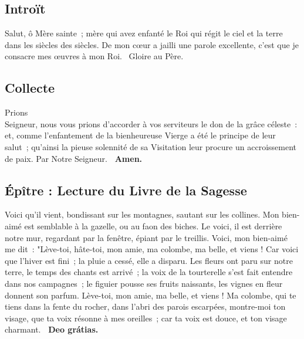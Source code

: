 

\clearpage
\begin{multicols}{2}
\subsection*{Introït}
{Salut, ô Mère sainte~; mère qui avez enfanté le Roi qui régit le ciel et la terre dans les siècles des siècles.}
De mon cœur a jailli une parole excellente, c’est que je consacre mes œuvres à mon Roi. \vb\ Gloire au Père.

\subsection*{Collecte}
{Prions\\
Seigneur, nous vous prions d’accorder à vos serviteurs le don de la grâce céleste~: et, comme l’enfantement de la bienheureuse Vierge a été le principe de leur salut~; qu’ainsi la pieuse solennité de sa Visitation leur procure un accroissement de paix. Par Notre Seigneur.}
{\textbf{ \rb\ Amen.}}


\subsection*{Épître : Lecture du Livre de la Sagesse}
Voici qu’il vient, bondissant sur les montagnes, sautant sur les collines. Mon bien-aimé est semblable à la gazelle, ou au faon des biches. Le voici, il est derrière notre mur, regardant par la fenêtre, épiant par le treillis. Voici, mon bien-aimé me dit~: "Lève-toi, hâte-toi, mon amie, ma colombe, ma belle, et viens ! Car voici que l’hiver est fini~; la pluie a cessé, elle a disparu. Les fleurs ont paru sur notre terre, le temps des chants est arrivé~; la voix de la tourterelle s’est fait entendre dans nos campagnes~; le figuier pousse ses fruits naissants, les vignes en fleur donnent son parfum. Lève-toi, mon amie, ma belle, et viens ! Ma colombe, qui te tiens dans la fente du rocher, dans l’abri des parois escarpées, montre-moi ton visage, que ta voix résonne à mes oreilles~; car ta voix est douce, et ton visage charmant.
\textbf{\rb\ Deo grátias.}


\end{multicols}
